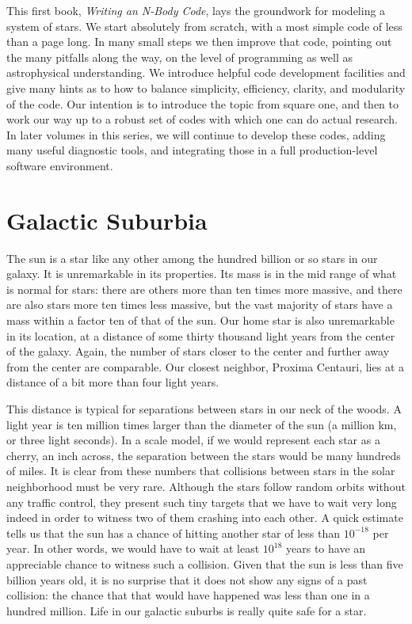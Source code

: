This first book, {\it Writing an N-Body Code}, lays the groundwork for
modeling a system of stars.  We start absolutely from scratch, with a
most simple code of less than a page long.  In many small steps we
then improve that code, pointing out the many pitfalls along the way,
on the level of programming as well as astrophysical understanding.
We introduce helpful code development facilities and give many hints as
to how to balance simplicity, efficiency, clarity, and modularity of
the code.  Our intention is to introduce the topic from square one,
and then to work our way up to a robust set of codes with which one
can do actual research.  In later volumes in this series, we will
continue to develop these codes, adding many useful diagnostic tools,
and integrating those in a full production-level software environment.

\section{Galactic Suburbia}

The sun is a star like any other among the hundred billion or so stars
in our galaxy.  It is unremarkable in its properties.  Its mass is in
the mid range of what is normal for stars: there are others more than
ten times more massive, and there are also stars more ten times less
massive, but the vast majority of stars have a mass within a factor
ten of that of the sun.  Our home star is also unremarkable in its
location, at a distance of some thirty thousand light years from the
center of the galaxy.  Again, the number of stars closer to the center
and further away from the center are comparable.  Our closest neighbor,
Proxima Centauri, lies at a distance of a bit more than four light years.

This distance is typical for separations between stars in our neck of
the woods.  A light year is ten million times larger than the diameter
of the sun (a million km, or three light seconds).  In a scale model,
if we would represent each star as a cherry, an inch across, the
separation between the stars would be many hundreds of miles.  It is
clear from these numbers that collisions between stars in the solar
neighborhood must be very rare.  Although the stars follow random
orbits without any traffic control, they present such tiny targets
that we have to wait very long indeed in order to witness two of them
crashing into each other.  A quick estimate tells us that the sun has
a chance of hitting another star of less than $10^{-18}$ per year.  In
other words, we would have to wait at least $10^{18}$ years to have an
appreciable chance to witness such a collision.  Given that the sun is
less than five billion years old, it is no surprise that it does not
show any signs of a past collision: the chance that that would have
happened was less than one in a hundred million.  Life in our galactic
suburbs is really quite safe for a star.

